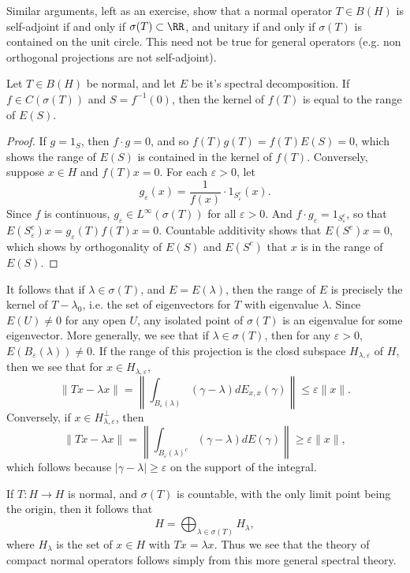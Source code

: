 Similar arguments, left as an exercise, show that a normal operator $T \in B(H)$ is self-adjoint if and only if $\sigma(T) \subset \RR$, and unitary if and only if $\sigma(T)$ is contained on the unit circle. This need not be true for general operators (e.g. non orthogonal projections are not self-adjoint).

\begin{theorem}
    Let $T \in B(H)$ be normal, and let $E$ be it's spectral decomposition. If $f \in C(\sigma(T))$ and $S = f^{-1}(0)$, then the kernel of $f(T)$ is equal to the range of $E(S)$.
\end{theorem}
\begin{proof}
    If $g = 1_S$, then $f \cdot g = 0$, and so $f(T) g(T) = f(T) E(S) = 0$, which shows the range of $E(S)$ is contained in the kernel of $f(T)$. Conversely, suppose $x \in H$ and $f(T) x = 0$. For each $\varepsilon > 0$, let
    \[ g_\varepsilon(x) = \frac{1}{f(x)} \cdot 1_{S_\varepsilon^c}(x). \]
    Since $f$ is continuous, $g_\varepsilon \in L^\infty(\sigma(T))$ for all $\varepsilon > 0$. And $f \cdot g_\varepsilon = 1_{S_\varepsilon^c}$, so that $E(S_\varepsilon^c) x = g_\varepsilon(T) f(T) x = 0$. Countable additivity shows that $E(S^c) x = 0$, which shows by orthogonality of $E(S)$ and $E(S^c)$ that $x$ is in the range of $E(S)$.
\end{proof}

It follows that if $\lambda \in \sigma(T)$, and $E = E(\lambda)$, then the range of $E$ is precisely the kernel of $T - \lambda_0$, i.e. the set of eigenvectors for $T$ with eigenvalue $\lambda$. Since $E(U) \neq 0$ for any open $U$, any isolated point of $\sigma(T)$ is an eigenvalue for some eigenvector. More generally, we see that if $\lambda \in \sigma(T)$, then for any $\varepsilon > 0$, $E(B_\varepsilon(\lambda)) \neq 0$. If the range of this projection is the closd subspace $H_{\lambda,\varepsilon}$ of $H$, then we see that for $x \in H_{\lambda,\varepsilon}$,
%
\[ \| Tx - \lambda x \| = \left\| \int_{B_\varepsilon(\lambda)} (\gamma - \lambda) dE_{x,x}(\gamma) \right\| \leq \varepsilon \| x \|. \]
%
Conversely, if $x \in H_{\lambda,\varepsilon}^\perp$, then
%
\[ \| Tx - \lambda x \| = \left\| \int_{B_\varepsilon(\lambda)^c} (\gamma - \lambda) dE(\gamma) \right\| \geq \varepsilon \| x \|, \]
%
which follows because $|\gamma - \lambda| \geq \varepsilon$ on the support of the integral.

If $T: H \to H$ is normal, and $\sigma(T)$ is countable, with the only limit point being the origin, then it follows that
%
\[ H = \bigoplus_{\lambda \in \sigma(T)} H_\lambda, \]
%
where $H_\lambda$ is the set of $x \in H$ with $Tx = \lambda x$. Thus we see that the theory of compact normal operators follows simply from this more general spectral theory.

